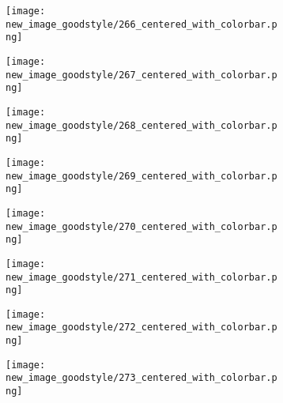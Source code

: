 \documentclass[a4paper,12pt]{article}
\begin{document}
\begin{figure}[H]
  \begin{subfigure}{0.11\textwidth}
    \texttt{[image: new\_image\_goodstyle/266\_centered\_with\_colorbar.png]}
  \end{subfigure}
  \hfill
  \begin{subfigure}{0.11\textwidth}
    \texttt{[image: new\_image\_goodstyle/267\_centered\_with\_colorbar.png]}
  \end{subfigure}
  \hfill
  \begin{subfigure}{0.11\textwidth}
    \texttt{[image: new\_image\_goodstyle/268\_centered\_with\_colorbar.png]}
  \end{subfigure}
  \hfill
  \begin{subfigure}{0.11\textwidth}
    \texttt{[image: new\_image\_goodstyle/269\_centered\_with\_colorbar.png]}
  \end{subfigure}
  \hfill
  \begin{subfigure}{0.11\textwidth}
    \texttt{[image: new\_image\_goodstyle/270\_centered\_with\_colorbar.png]}
  \end{subfigure}
  \hfill
  \begin{subfigure}{0.11\textwidth}
    \texttt{[image: new\_image\_goodstyle/271\_centered\_with\_colorbar.png]}
  \end{subfigure}
  \hfill
  \begin{subfigure}{0.11\textwidth}
    \texttt{[image: new\_image\_goodstyle/272\_centered\_with\_colorbar.png]}
  \end{subfigure}
  \hfill
  \begin{subfigure}{0.11\textwidth}
    \texttt{[image: new\_image\_goodstyle/273\_centered\_with\_colorbar.png]}
  \end{subfigure}
  \hfill
\end{figure}
\end{document}
